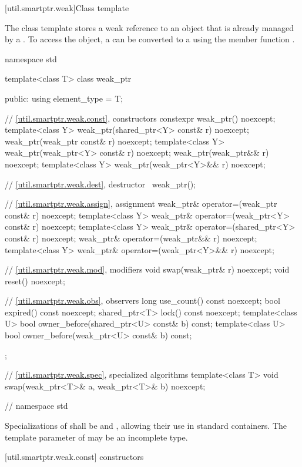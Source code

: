 [util.smartptr.weak]{Class template }

\pnum
{}%
The  class template stores a weak reference to an object
that is already managed by a . To access the object, a
 can be converted to a  using the member
function .

\begin{codeblock}
namespace std {
  template<class T> class weak_ptr {
  public:
    using element_type = T;

    // \ref{util.smartptr.weak.const}, constructors
    constexpr weak_ptr() noexcept;
    template<class Y> weak_ptr(shared_ptr<Y> const& r) noexcept;
    weak_ptr(weak_ptr const& r) noexcept;
    template<class Y> weak_ptr(weak_ptr<Y> const& r) noexcept;
    weak_ptr(weak_ptr&& r) noexcept;
    template<class Y> weak_ptr(weak_ptr<Y>&& r) noexcept;

    // \ref{util.smartptr.weak.dest}, destructor
    ~weak_ptr();

    // \ref{util.smartptr.weak.assign}, assignment
    weak_ptr& operator=(weak_ptr const& r) noexcept;
    template<class Y> weak_ptr& operator=(weak_ptr<Y> const& r) noexcept;
    template<class Y> weak_ptr& operator=(shared_ptr<Y> const& r) noexcept;
    weak_ptr& operator=(weak_ptr&& r) noexcept;
    template<class Y> weak_ptr& operator=(weak_ptr<Y>&& r) noexcept;    

    // \ref{util.smartptr.weak.mod}, modifiers
    void swap(weak_ptr& r) noexcept;
    void reset() noexcept;

    // \ref{util.smartptr.weak.obs}, observers
    long use_count() const noexcept;
    bool expired() const noexcept;
    shared_ptr<T> lock() const noexcept;
    template<class U> bool owner_before(shared_ptr<U> const& b) const;
    template<class U> bool owner_before(weak_ptr<U> const& b) const;
  };

  // \ref{util.smartptr.weak.spec}, specialized algorithms
  template<class T> void swap(weak_ptr<T>& a, weak_ptr<T>& b) noexcept;
} // namespace std
\end{codeblock}

\pnum
Specializations of  shall be  and
, allowing their use in standard
containers.  The template parameter  of  may be an
incomplete type.

[util.smartptr.weak.const]{ constructors}

